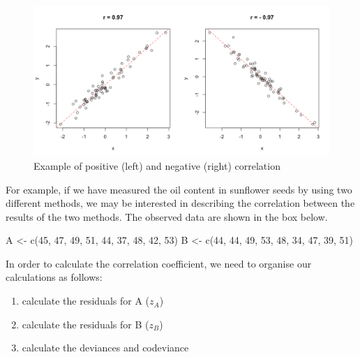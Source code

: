 \documentclass[a4paper,12pt,oneside]{book}
\providecommand{\tightlist}{%
  \setlength{\itemsep}{0pt}\setlength{\parskip}{0pt}}
\newenvironment{Shaded}{\begin{snugshade}}{\end{snugshade}}
\newcommand{\DecValTok}[1]{#1}
\newcommand{\OtherTok}[1]{#1}
\newcommand{\FunctionTok}[1]{#1}
\newcommand{\NormalTok}[1]{#1}
\begin{document}
\begin{figure}

{\centering \includegraphics[width=0.75\linewidth]{_images/CorrelationExample} 

}

\caption{Example of positive (left) and negative (right) correlation}\label{fig:figName311}
\end{figure}

For example, if we have measured the oil content in sunflower seeds by using two different methods, we may be interested in describing the correlation between the results of the two methods. The observed data are shown in the box below.

\begin{Shaded}
\begin{Highlighting}[]
\NormalTok{A }\OtherTok{\textless{}{-}} \FunctionTok{c}\NormalTok{(}\DecValTok{45}\NormalTok{, }\DecValTok{47}\NormalTok{, }\DecValTok{49}\NormalTok{, }\DecValTok{51}\NormalTok{, }\DecValTok{44}\NormalTok{, }\DecValTok{37}\NormalTok{, }\DecValTok{48}\NormalTok{, }\DecValTok{42}\NormalTok{, }\DecValTok{53}\NormalTok{)}
\NormalTok{B }\OtherTok{\textless{}{-}} \FunctionTok{c}\NormalTok{(}\DecValTok{44}\NormalTok{, }\DecValTok{44}\NormalTok{, }\DecValTok{49}\NormalTok{, }\DecValTok{53}\NormalTok{, }\DecValTok{48}\NormalTok{, }\DecValTok{34}\NormalTok{, }\DecValTok{47}\NormalTok{, }\DecValTok{39}\NormalTok{, }\DecValTok{51}\NormalTok{)}
\end{Highlighting}
\end{Shaded}

In order to calculate the correlation coefficient, we need to organise our calculations as follows:

\begin{enumerate}
\def\labelenumi{\arabic{enumi}.}
\tightlist
\item
  calculate the residuals for A (\(z_A\))
\item
  calculate the residuals for B (\(z_B\))
\item
  calculate the deviances and codeviance
\end{enumerate}
\end{document}
